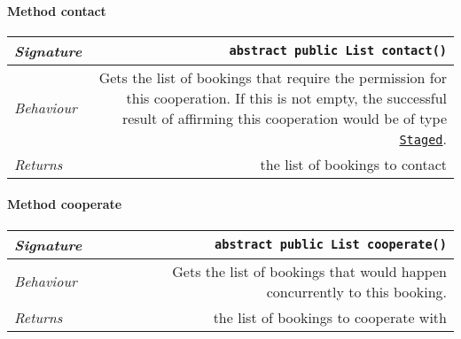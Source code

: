 \begin{adjustwidth}{1.5em}{0pt}
\begin{adjustwidth}{1.5em}{0pt}
\begin{adjustwidth}{1.5em}{0pt}
{\begin{tabularx}{1.0\linewidth}{@{}l R@{}}
      \end{tabularx}}\paragraph{Method contact\label{edu.kit.hci.soli.dto.BookingAttemptResult.PossibleCooperation@contact()}}
      \begin{adjustwidth}{1.5em}{0pt}
        {\begin{tabularx}{1.0\linewidth}{@{}l R@{}}
          \emph{Signature} & \texttt{abstract public \texttt{List} contact()} \\
          \hline
          \emph{Behaviour} & Gets the list of bookings that require the permission for this cooperation. If this is not empty, the successful result of affirming this cooperation would be of type  \texttt{\hyperref[edu.kit.hci.soli.dto.BookingAttemptResult.Staged]{\texttt{Staged}}}.    \\
          \hline
          \emph{Returns} & the list of bookings to contact  \\
          \hline
  
        \end{tabularx}}
      \end{adjustwidth}\paragraph{Method cooperate\label{edu.kit.hci.soli.dto.BookingAttemptResult.PossibleCooperation@cooperate()}}
      \begin{adjustwidth}{1.5em}{0pt}
        {\begin{tabularx}{1.0\linewidth}{@{}l R@{}}
          \emph{Signature} & \texttt{abstract public \texttt{List} cooperate()} \\
          \hline
          \emph{Behaviour} & Gets the list of bookings that would happen concurrently to this booking.    \\
          \hline
          \emph{Returns} & the list of bookings to cooperate with  \\
          \hline
  

\end{tabularx}}
\end{adjustwidth}
\end{adjustwidth}
\end{adjustwidth}
\end{adjustwidth}
